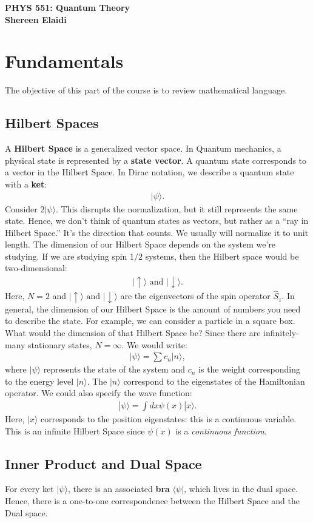 \documentclass[11pt]{article}
\theoremstyle{definition}
\theoremstyle{theorem}
\newcommand{\ket}[1]{| #1 \rangle}
\newcommand{\bra}[1]{\langle #1|}
\begin{document}
\begin{center}
	\textbf{PHYS 551: Quantum Theory} \\
	\textbf{Shereen Elaidi}
\end{center}

\section{Fundamentals}
The objective of this part of the course is to review mathematical language. 
\subsection{Hilbert Spaces}
A \textbf{Hilbert Space} is a generalized vector space. In Quantum mechanics, a physical state is represented by a \textbf{state vector}. A quantum state corresponds to a vector in the Hilbert Space. In Dirac notation, we describe a quantum state with a \textbf{ket}:
\begin{align}
	\ket{\psi}.
\end{align}
Consider \( 2 \ket{\psi} \). This disrupts the normalization, but it still represents the same state. Hence, we don't think of quantum states as vectors, but rather as a ``ray in Hilbert Space.'' It's the direction that counts. We usually will normalize it to unit length.
\newline
\newline
The dimension of our Hilbert Space depends on the system we're studying. If we are studying spin \(1/2 \) systems, then the Hilbert space would be two-dimensional:
\begin{align*}
	\ket{\uparrow} \text{ and } \ket{\downarrow}. 	
\end{align*}
Here, \( N = 2 \) and \( \ket{\uparrow} \text{ and } \ket{\downarrow} \) are the eigenvectors of the spin operator \( \hat{S}_z \). In general, the dimension of our Hilbert Space is the amount of numbers you need to describe the state. For example, we can consider a particle in a square box. What would the dimension of that Hilbert Space be? Since there are infinitely-many stationary states, \( N = \infty \). We would write: 
\begin{align*}
	\ket{\psi} = \sum c_n \ket{n}, 	
\end{align*}
where \( \ket{\psi} \) represents the state of the system and \( c_n \) is the weight corresponding to the energy level \( \ket{n} \). The \( \ket{n} \) correspond to the eigenstates of the Hamiltonian operator. We could also specify the wave function: 
\begin{align}
	\ket{\psi} = \int dx \psi(x) \ket{x}.
\end{align}
Here, \( \ket{x} \) corresponds to the position eigenstates: this is a continuous variable. This is an infinite Hilbert Space since \( \psi(x) \) is a \emph{continuous function}. 

\subsection{Inner Product and Dual Space}
For every ket \( \ket{\psi} \), there is an associated \textbf{bra} \( \bra{\psi} \), which lives in the dual space. Hence, there is a one-to-one correspondence between the Hilbert Space and the Dual space. 
\end{document}
